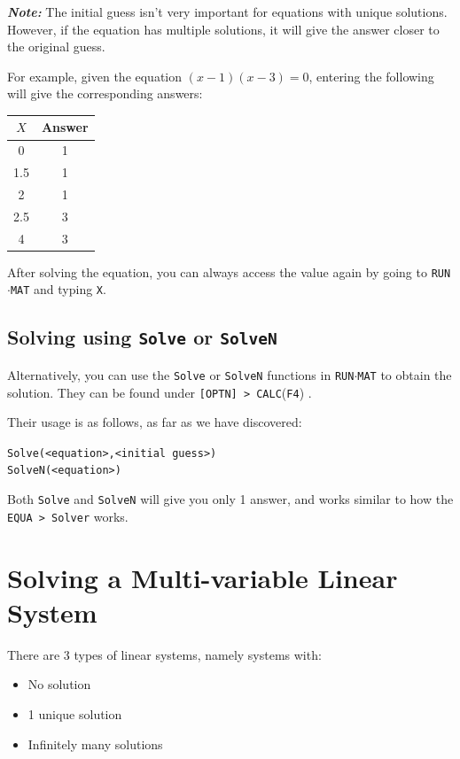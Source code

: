 \documentclass[a5paper,draft]{memoir}
\def\code#1{\texttt{#1}}
\def\note#1{\textbf{\textit{Note:}} #1}
\def\runmat{\code{RUN$\cdot$MAT} }
\def\Ffour{(\code{F4}) }
\begin{document}
\note{}The initial guess isn't very important for equations with unique solutions. However, if the equation has multiple solutions, it will give the answer closer to the original guess.

For example, given the equation $(x-1)(x-3)=0$, entering the following will give the corresponding answers:
\begin{center}
	\renewcommand{\arraystretch}{1.2}
	\begin{tabular}{|c|c|}
		\hline
		$X$ 	& Answer \\
		\hline
		0		& 1 \\
		\hline
		1.5 	& 1 \\
		\hline
		2		& 1 \\
		\hline
		2.5		& 3 \\
		\hline
		4		& 3 \\
		\hline
	\end{tabular}
\end{center}

After solving the equation, you can always access the value again by going to \runmat and typing \code{X}.

\subsection{Solving using \code{Solve} or \code{SolveN}}
Alternatively, you can use the \code{Solve} or \code{SolveN} functions in \runmat to obtain the solution. They can be found under \code{[OPTN] > CALC}\Ffour.

Their usage is as follows, as far as we have discovered:
\begin{center}
	\code{Solve(<equation>,<initial guess>)} \\
	\code{SolveN(<equation>)}
\end{center}

Both \code{Solve} and \code{SolveN} will give you only 1 answer, and works similar to how the \code{EQUA > Solver} works.

\section{Solving a Multi-variable Linear System}
There are 3 types of linear systems, namely systems with:
\begin{itemize}
	\item No solution
	\item 1 unique solution
	\item Infinitely many solutions
\end{itemize}
\end{document}
